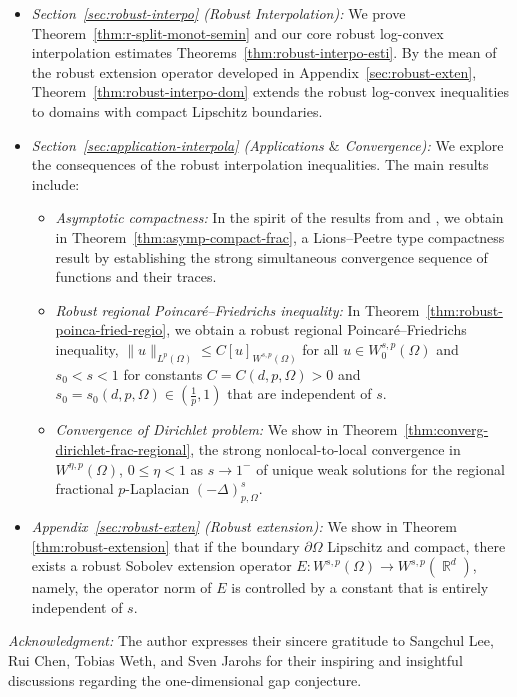 \documentclass[12pt, reqno]{amsart}%
\theoremstyle{plain}  %
\theoremstyle{definition}  %
\theoremstyle{remark}
\numberwithin{equation}{section}
\DeclareMathOperator{\R}{\mathbb{R}}
\begin{document}
\begin{itemize}
    \item \textit{Section~\ref{sec:robust-interpo} (Robust Interpolation): } We prove  Theorem~\ref{thm:r-split-monot-semin} and our core robust log-convex interpolation estimates Theorems~\ref{thm:robust-interpo-esti}. By the mean of the robust extension operator developed in Appendix~\ref{sec:robust-exten},  Theorem~\ref{thm:robust-interpo-dom} extends the robust log-convex inequalities to domains with compact Lipschitz boundaries.
    \item \textit{Section~\ref{sec:application-interpola} (Applications $\&$ Convergence):} We explore the consequences of the robust interpolation inequalities. The main results include:
    \begin{itemize}
        \item \emph{Asymptotic compactness:}  In the spirit of the results from \cite{Pon04} and \cite{BBM01}, we obtain in Theorem~\ref{thm:asymp-compact-frac},  a Lions--Peetre type compactness result by  establishing the strong simultaneous convergence sequence of functions and their traces.
        \item \emph{Robust regional Poincar\'e--Friedrichs inequality:} In Theorem~\ref{thm:robust-poinca-fried-regio}, we obtain a robust regional Poincar\'e--Friedrichs inequality,  $\|u\|_{L^p(\Omega)} \leq C [u]_{W^{s,p}(\Omega)}$  for all $u \in W_0^{s,p}(\Omega)$ and $s_0 < s < 1$
for constants $C = C(d,p,\Omega) > 0$ and $s_0 = s_0(d,p,\Omega) \in (\frac{1}{p}, 1)$ that are independent of $s$.
\item \emph{Convergence of Dirichlet problem:} We show in  Theorem~\ref{thm:converg-dirichlet-frac-regional}, the strong nonlocal-to-local convergence in $W^{\eta,p}(\Omega)$, $0\leq \eta<1$ as $s\to 1^-$ of unique weak solutions for the regional fractional $p$-Laplacian $(-\Delta)^s_{p,\Omega}$.
 \end{itemize}
\item \textit{Appendix~\ref{sec:robust-exten} (Robust extension):} We show in Theorem \ref{thm:robust-extension} that if the boundary $\partial \Omega$ Lipschitz and  compact, there exists a robust Sobolev extension operator $E: W^{s,p}(\Omega) \to W^{s,p}(\R^d)$, namely, the operator norm of $E$ is controlled by a constant that is entirely independent of $s$.
\end{itemize}

\medskip

\emph{Acknowledgment:}
The author expresses their sincere gratitude to Sangchul Lee, Rui Chen, Tobias Weth, and Sven Jarohs for their inspiring and insightful discussions regarding the one-dimensional gap conjecture.
\end{document}
